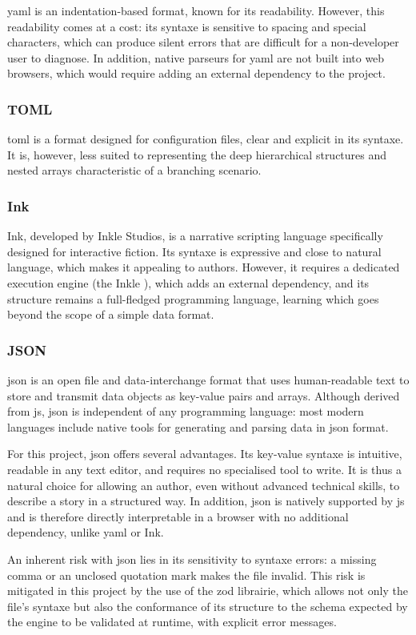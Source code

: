 \gls{yaml} is an indentation-based format, known for its readability. However, this readability comes at a cost: its \gls{syntaxe} is sensitive to spacing and special characters, which can produce silent errors that are difficult for a non-developer user to diagnose. In addition, native \glspl{parseur} for \gls{yaml} are not built into web browsers, which would require adding an external dependency to the project. \parencite{noauthor_-_nodate}

\clearpage


\subsubsection{TOML}

\gls{toml} is a format designed for configuration files, clear and explicit in its \gls{syntaxe}. It is, however, less suited to representing the deep hierarchical structures and nested arrays characteristic of a branching scenario. \parencite{noauthor_toml_nodate}


\subsubsection{Ink}

Ink, developed by Inkle Studios, is a narrative scripting language specifically designed for interactive fiction. Its \gls{syntaxe} is expressive and close to natural language, which makes it appealing to authors. However, it requires a dedicated execution engine (the Inkle ), which adds an external dependency, and its structure remains a full-fledged programming language, learning which goes beyond the scope of a simple data format. \parencite{noauthor_ink_nodate}


\subsubsection{JSON}

\gls{json} is an open file and data-interchange format that uses human-readable text to store and transmit data objects as key-value pairs and arrays. Although derived from \gls{js}, \gls{json} is independent of any programming language: most modern languages include native tools for generating and parsing data in \gls{json} format. \parencite{noauthor_what_nodate}

For this project, \gls{json} offers several advantages. Its key-value \gls{syntaxe} is intuitive, readable in any text editor, and requires no specialised tool to write. It is thus a natural choice for allowing an author, even without advanced technical skills, to describe a story in a structured way. In addition, \gls{json} is natively supported by \gls{js} and is therefore directly interpretable in a browser with no additional dependency, unlike \gls{yaml} or Ink.

An inherent risk with \gls{json} lies in its sensitivity to \gls{syntaxe} errors: a missing comma or an unclosed quotation mark makes the file invalid. This risk is mitigated in this project by the use of the \gls{zod} \gls{librairie}, which allows not only the file's \gls{syntaxe} but also the conformance of its structure to the \gls{schema} expected by the engine to be validated at runtime, with explicit error messages.